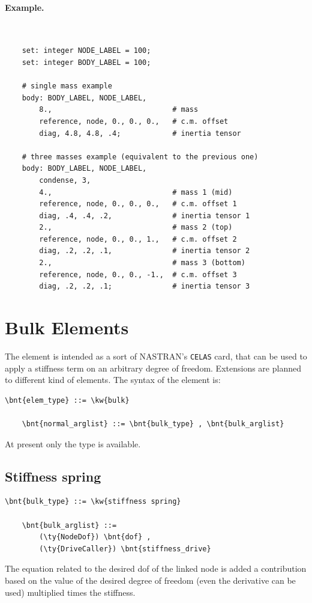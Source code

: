 \paragraph{Example.} \
\begin{verbatim}
    set: integer NODE_LABEL = 100;
    set: integer BODY_LABEL = 100;

    # single mass example
    body: BODY_LABEL, NODE_LABEL,
        8.,                            # mass
        reference, node, 0., 0., 0.,   # c.m. offset
        diag, 4.8, 4.8, .4;            # inertia tensor

    # three masses example (equivalent to the previous one)
    body: BODY_LABEL, NODE_LABEL,
        condense, 3,
        4.,                            # mass 1 (mid)
        reference, node, 0., 0., 0.,   # c.m. offset 1
        diag, .4, .4, .2,              # inertia tensor 1
        2.,                            # mass 2 (top)
        reference, node, 0., 0., 1.,   # c.m. offset 2
        diag, .2, .2, .1,              # inertia tensor 2
        2.,                            # mass 3 (bottom)
        reference, node, 0., 0., -1.,  # c.m. offset 3
        diag, .2, .2, .1;              # inertia tensor 3
\end{verbatim}



\section{Bulk Elements}
The  element is intended as a sort of NASTRAN's \texttt{CELAS} card,
that can be used to apply a stiffness term on an arbitrary degree of freedom.
Extensions are planned to different kind of elements.
The syntax of the  element is:
\begin{Verbatim}[commandchars=\\\{\}]
    \bnt{elem_type} ::= \kw{bulk}

    \bnt{normal_arglist} ::= \bnt{bulk_type} , \bnt{bulk_arglist}
\end{Verbatim}
At present only the  type is available.

\subsection{Stiffness spring}
\begin{Verbatim}[commandchars=\\\{\}]
    \bnt{bulk_type} ::= \kw{stiffness spring}

    \bnt{bulk_arglist} ::=
        (\ty{NodeDof}) \bnt{dof} ,
        (\ty{DriveCaller}) \bnt{stiffness_drive}
\end{Verbatim}
The equation related to the desired dof of the linked node is added a
contribution based on the value of the desired degree of freedom (even the
derivative can be used) multiplied times the stiffness.

